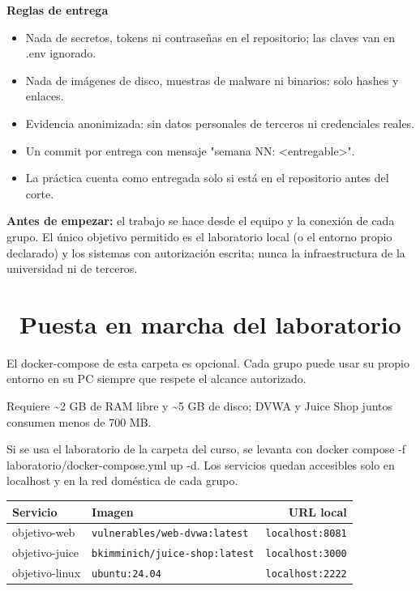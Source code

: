 \documentclass[11pt,a4paper]{article}
\newcommand{\iconotexto}[2]{\textcolor{cyanNeon}{\faIcon{#1}}~#2}
\begin{document}
\textbf{Reglas de entrega}

\begin{itemize}[leftmargin=1.4em,itemsep=2pt,topsep=3pt]
  \item Nada de secretos, tokens ni contraseñas en el repositorio; las claves van en .env ignorado.
  \item Nada de imágenes de disco, muestras de malware ni binarios: solo hashes y enlaces.
  \item Evidencia anonimizada: sin datos personales de terceros ni credenciales reales.
  \item Un commit por entrega con mensaje "semana NN: \textless{}entregable\textgreater{}".
  \item La práctica cuenta como entregada solo si está en el repositorio antes del corte.
\end{itemize}

\begin{tcolorbox}[cajaMejora]\textbf{Antes de empezar:} el trabajo se hace desde el equipo y la conexión de cada grupo. El único objetivo permitido es el laboratorio local (o el entorno propio declarado) y los sistemas con autorización escrita; nunca la infraestructura de la universidad ni de terceros.
\end{tcolorbox}

\section{\iconotexto{cube}{Puesta en marcha del laboratorio}}

El docker-compose de esta carpeta es opcional. Cada grupo puede usar su propio entorno en su PC siempre que respete el alcance autorizado.

Requiere \textasciitilde{}2 GB de RAM libre y \textasciitilde{}5 GB de disco; DVWA y Juice Shop juntos consumen menos de 700 MB.

Si se usa el laboratorio de la carpeta del curso, se levanta con docker compose -f laboratorio/docker-compose.yml up -d. Los servicios quedan accesibles solo en localhost y en la red doméstica de cada grupo.

\begin{tabularx}{\linewidth}{@{}l l r@{}}
\toprule
Servicio & Imagen & URL local\\
\midrule
objetivo-web & \texttt{vulnerables/web-dvwa:latest} & \texttt{localhost:8081} \\
objetivo-juice & \texttt{bkimminich/juice-shop:latest} & \texttt{localhost:3000} \\
objetivo-linux & \texttt{ubuntu:24.04} & \texttt{localhost:2222} \\
\bottomrule
\end{tabularx}
\end{document}
